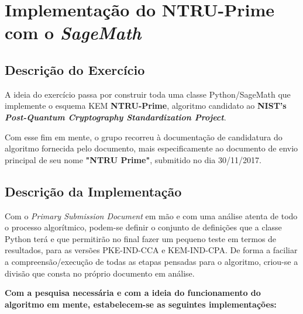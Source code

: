 \documentclass[12pt]{report}
\begin{document}
   
    \newpage
	  \hypersetup{linkcolor=black}
\vfill

	\tableofcontents
\vfill

	\newpage




    \section{\texorpdfstring{Implementação do NTRU-Prime com o
\emph{SageMath}}{Implementação do NTRU-Prime com o SageMath}}\label{implementauxe7uxe3o-do-ntru-prime-com-o-sagemath}
\vspace{5mm}
\subsection{Descrição do
Exercício}\label{descriuxe7uxe3o-do-exercuxedcio}
\vspace{2mm}
A ideia do exercício passa por construir toda uma classe Python/SageMath
que implemente o esquema KEM \textbf{NTRU-Prime}, algoritmo candidato ao
\textbf{NIST's \emph{Post-Quantum Cryptography Standardization
Project}}.

Com esse fim em mente, o grupo recorreu à documentação de candidatura do
algoritmo fornecida pelo documento, mais especificamente ao documento de
envio principal de seu nome \textbf{"NTRU Prime"}, submitido no dia
30/11/2017.
\vspace{3mm}
\subsection{Descrição da
Implementação}\label{descriuxe7uxe3o-da-implementauxe7uxe3o}
\vspace{2mm}
Com o \emph{Primary Submission Document} em mão e com uma análise atenta
de todo o processo algorítmico, podem-se definir o conjunto de
definições que a classe Python terá e que permitirão no final fazer um
pequeno teste em termos de resultados, para as versões PKE-IND-CCA e
KEM-IND-CPA. De forma a faciliar a compreensão/execução de todas as
etapas pensadas para o algoritmo, criou-se a divisão que consta no
próprio documento em análise.
\vspace{3mm}

\textbf{Com a pesquisa necessária e com a ideia do funcionamento do
algoritmo em mente, estabelecem-se as seguintes implementações:}
\vspace{2mm}
\end{document}
